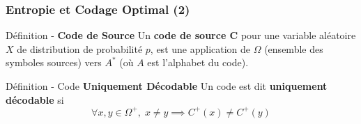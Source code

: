 \documentclass[aspectratio=43]{beamer}
\begin{document}
\begin{frame}
    \frametitle{Entropie et Codage Optimal (2)}

    \begin{alertblock}{Définition - \bfseries Code de Source}
        Un \textbf{code de source C} pour une variable aléatoire $X$ de distribution de probabilité $p$, est une application de $\Omega$ (ensemble des symboles sources) vers $A^*$
        (où $A$ est l'alphabet du code).
    \end{alertblock}

    \vspace*{2em}

    \begin{alertblock}{Définition - Code \bfseries Uniquement Décodable}
        Un code est dit \textbf{uniquement décodable} si
        $$ \forall x, y \in \Omega^+, \; x \neq y \implies C^+(x) \neq C^+(y)$$
    \end{alertblock}
\end{frame}
    
\end{document}

